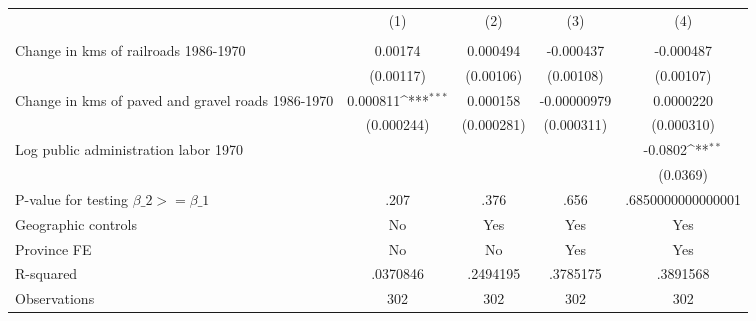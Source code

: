 {
\def\sym#1{\ifmmode^{#1}\else\(^{#1}\)\fi}
\begin{tabular}{l*{4}{c}}
\hline\hline
                &\multicolumn{1}{c}{(1)}&\multicolumn{1}{c}{(2)}&\multicolumn{1}{c}{(3)}&\multicolumn{1}{c}{(4)}\\
                &\multicolumn{1}{c}{}&\multicolumn{1}{c}{}&\multicolumn{1}{c}{}&\multicolumn{1}{c}{}\\
\hline
Change in kms of railroads 1986-1970&  0.00174         & 0.000494         &-0.000437         &-0.000487         \\
                &(0.00117)         &(0.00106)         &(0.00108)         &(0.00107)         \\
[1em]
Change in kms of paved and gravel roads 1986-1970& 0.000811\sym{***}& 0.000158         &-0.00000979         &0.0000220         \\
                &(0.000244)         &(0.000281)         &(0.000311)         &(0.000310)         \\
[1em]
Log public administration labor 1970&                  &                  &                  &  -0.0802\sym{**} \\
                &                  &                  &                  & (0.0369)         \\
\hline
P-value for testing $\beta\_{2} >= \beta\_{1}$&     .207         &     .376         &     .656         &.6850000000000001         \\
Geographic controls&       No         &      Yes         &      Yes         &      Yes         \\
Province FE     &       No         &       No         &      Yes         &      Yes         \\
R-squared       & .0370846         & .2494195         & .3785175         & .3891568         \\
Observations    &      302         &      302         &      302         &      302         \\
\hline\hline
\end{tabular}
}
